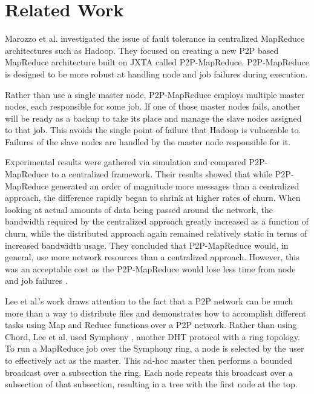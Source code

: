 \section{Related Work}



Marozzo et al. \cite{marozzo2012p2p} investigated the issue of fault tolerance in centralized MapReduce architectures such as Hadoop.  They focused on creating a new P2P based MapReduce architecture built on JXTA \cite{935182} called P2P-MapReduce.  P2P-MapReduce is designed to be more robust at handling node and job failures during execution.

Rather than use a single master node, P2P-MapReduce employs multiple master nodes, each responsible for some job.  If one of those master nodes fails, another will be ready as a backup to take its place and manage the slave nodes assigned to that job.  This avoids the single point of failure that Hadoop is vulnerable to. Failures of the slave nodes are handled by the master node responsible for it.

Experimental results were gathered via simulation and compared P2P-MapReduce to a centralized framework. Their results showed that while P2P-MapReduce generated an order of magnitude more messages than a centralized approach, the difference rapidly began to shrink at higher rates of churn.  When looking at actual amounts of data being passed around the network, the bandwidth required by the centralized approach greatly increased as a function of churn, while the distributed approach again remained relatively static in terms of increased bandwidth usage.  They concluded that P2P-MapReduce would, in general, use more network resources than a centralized approach. However, this was an acceptable cost as the P2P-MapReduce would lose less time from node and job failures \cite{marozzo2012p2p}.


Lee et al.'s work \cite{leemap} draws attention to the fact that a P2P network can be much more than a way to distribute files and demonstrates how to accomplish different tasks using Map and Reduce functions over a P2P network.  Rather than using Chord, Lee et al. used Symphony \cite{symphony}, another DHT protocol with a ring topology.  To run a MapReduce job over the Symphony ring, a node is selected by the user to effectively act as the master.  This ad-hoc master then performs a bounded broadcast over a subsection the ring.  Each node repeats this broadcast over a subsection of that subsection, resulting in a tree with the first node at the top.  

